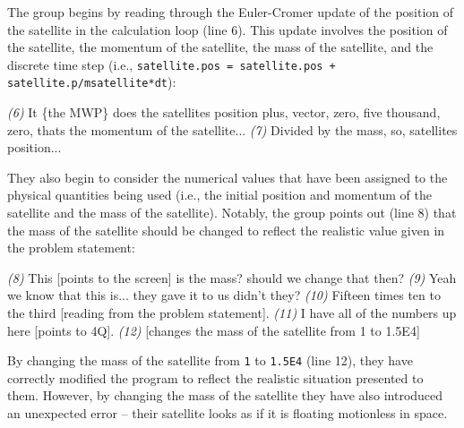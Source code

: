 \documentclass{msuphddissertation}
\begin{document}
\begin{doublespace}
The group begins by reading through the Euler-Cromer update of the position of the satellite in the calculation loop (line 6).  This update involves the position of the satellite, the momentum of the satellite, the mass of the satellite, and the discrete time step (i.e., \texttt{satellite.pos = satellite.pos + satellite.p/msatellite*dt}):  \begin{description}
\SC \textit{(6)} It \{the MWP\} does the satellites position plus, vector, zero, five thousand, zero, thats the momentum of the satellite...
\SC \textit{(7)} Divided by the mass, so, satellites position...\end{description}  They also begin to consider the numerical values that have been assigned to the physical quantities being used (i.e., the initial position and momentum of the satellite and the mass of the satellite).  Notably, the group points out (line 8) that the mass of the satellite should be changed to reflect the realistic value given in the problem statement: \begin{description}
\SD \textit{(8)} This [points to the screen] is the mass? should we change that then?
\SC \textit{(9)} Yeah we know that this is... they gave it to us didn't they?
\SD \textit{(10)} Fifteen times ten to the third [reading from the problem statement].
\SA \textit{(11)} I have all of the numbers up here [points to 4Q].
\SC \textit{(12)} [changes the mass of the satellite from 1 to 1.5E4]
\end{description}  By changing the mass of the satellite from \texttt{1} to \texttt{1.5E4} (line 12), they have correctly modified the program to reflect the realistic situation presented to them.  However, by changing the mass of the satellite they have also introduced an unexpected error -- their satellite looks as if it is floating motionless in space.


\end{doublespace}
\end{document}
